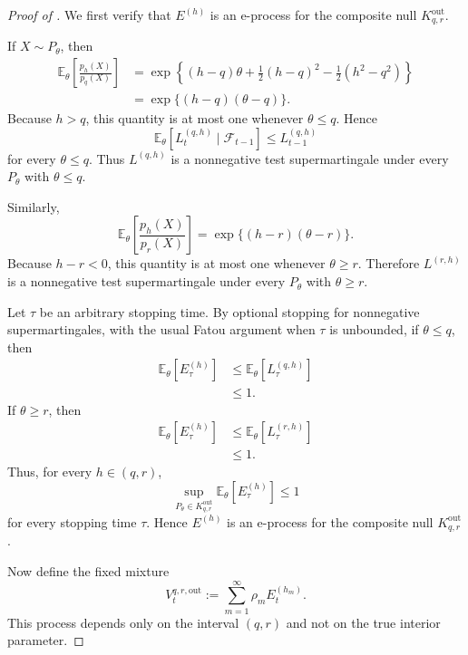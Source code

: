 \documentclass[10pt,a4paper]{amsart}
\begin{document}
\begin{proof}[Proof of ]
We first verify that $E^{(h)}$ is an e-process for the
composite null $K_{q,r}^{\mathrm{out}}$.

If $X\sim P_\theta$, then
\begin{align*}
    \mathbb E_\theta
    \left[
        \frac{p_h(X)}{p_q(X)}
    \right]
    &=
    \exp\left\{
        (h-q)\theta
        +
        \frac12(h-q)^2
        -
        \frac12(h^2-q^2)
    \right\}\\
    &=
    \exp\{(h-q)(\theta-q)\}.
\end{align*}
Because $h>q$, this quantity is at most one whenever
$\theta\le q$. Hence
\[
    \mathbb E_\theta
    \left[
        L_t^{(q,h)}
        \mid
        \mathcal F_{t-1}
    \right]
    \le
    L_{t-1}^{(q,h)}
\]
for every $\theta\le q$. Thus $L^{(q,h)}$ is a nonnegative test
supermartingale under every $P_\theta$ with $\theta\le q$.

Similarly,
\[
    \mathbb E_\theta
    \left[
        \frac{p_h(X)}{p_r(X)}
    \right]
    =
    \exp\{(h-r)(\theta-r)\}.
\]
Because $h-r<0$, this quantity is at most one whenever
$\theta\ge r$. Therefore $L^{(r,h)}$ is a nonnegative test
supermartingale under every $P_\theta$ with $\theta\ge r$.

Let $\tau$ be an arbitrary stopping time. By optional stopping
for nonnegative supermartingales, with the usual Fatou argument
when $\tau$ is unbounded, if $\theta\le q$, then
\[
\begin{aligned}
    \mathbb E_\theta
    \left[
        E_\tau^{(h)}
    \right]
    &\le
    \mathbb E_\theta
    \left[
        L_\tau^{(q,h)}
    \right]\\
    &\le1.
\end{aligned}
\]
If $\theta\ge r$, then
\[
\begin{aligned}
    \mathbb E_\theta
    \left[
        E_\tau^{(h)}
    \right]
    &\le
    \mathbb E_\theta
    \left[
        L_\tau^{(r,h)}
    \right]\\
    &\le1.
\end{aligned}
\]
Thus, for every $h\in(q,r)$,
\[
    \sup_{P_\theta\in K_{q,r}^{\mathrm{out}}}
    \mathbb E_\theta
    \left[
        E_\tau^{(h)}
    \right]
    \le1
\]
for every stopping time $\tau$. Hence $E^{(h)}$ is an e-process
for the composite null $K_{q,r}^{\mathrm{out}}$.

Now define the fixed mixture
\begin{equation}
\label{eq:gaussian-universal-mixture}
    V_t^{q,r,\mathrm{out}}
    :=
    \sum_{m=1}^\infty
    \rho_m E_t^{(h_m)}.
\end{equation}
This process depends only on the interval $(q,r)$ and not on the
true interior parameter.


\end{proof}
\end{document}

